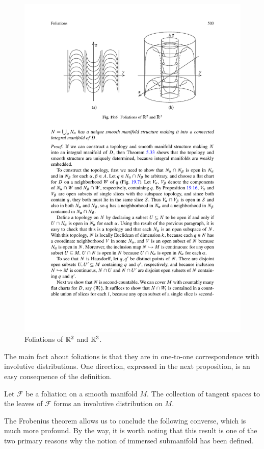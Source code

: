 \begin{figure}[htbp]
\centering
\includegraphics{pictures/foliation}
\caption{Foliations of $\mathbb{R}^2$ and $\mathbb{R}^3$.}
\end{figure}
The main fact about foliations is that they are in one-to-one correspondence with
involutive distributions. One direction, expressed in the next proposition, is an easy consequence of the definition.
\begin{proposition}
Let $\mathcal{F}$ be a foliation on a smooth manifold $M$. The collection of tangent spaces to the leaves of $\mathcal{F}$ forms an involutive distribution on $M$.
\end{proposition}
The Frobenius theorem allows us to conclude the following converse, which is much more profound. By the way, it is worth noting that this result is one of the two primary reasons why the notion of immersed submanifold has been defined.
